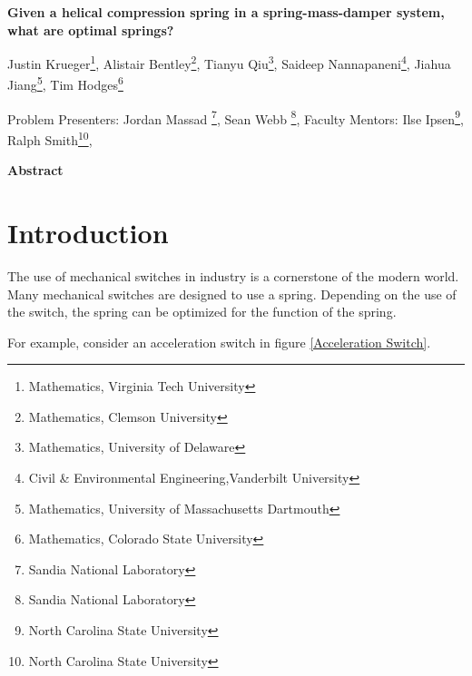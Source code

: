 \documentclass[10pt]{article}
\begin{document}
\centerline{\large \bf Given a helical compression spring in a spring-mass-damper system, what are optimal springs?}

\vspace{.1truein}

\def\thefootnote{\arabic{footnote}}
\begin{center}
  Justin Krueger\footnote{Mathematics, Virginia Tech University},
  Alistair Bentley\footnote{Mathematics, Clemson University},
  Tianyu Qiu\footnote{Mathematics, University of Delaware},
  Saideep Nannapaneni\footnote{Civil \& Environmental Engineering,Vanderbilt University},
  Jiahua Jiang\footnote{Mathematics, University of Massachusetts Dartmouth },
  Tim Hodges\footnote{Mathematics, Colorado State University}
\end{center}


\begin{center}
Problem Presenters: Jordan Massad \footnote{Sandia National Laboratory},
Sean Webb \footnote{Sandia National Laboratory},
	Faculty Mentors: Ilse Ipsen\footnote{North Carolina State University},
	Ralph Smith\footnote{North Carolina State University}, 
\end{center}


\vspace{.3truein}
\centerline{\bf Abstract}






\section{Introduction}

The use of mechanical switches in industry is a cornerstone of the modern world. Many mechanical switches are designed to use a spring. Depending on the use of the switch, the spring can be optimized for the function of the spring. 

For example, consider an acceleration switch in figure \ref{Acceleration Switch}. 
\end{document}
